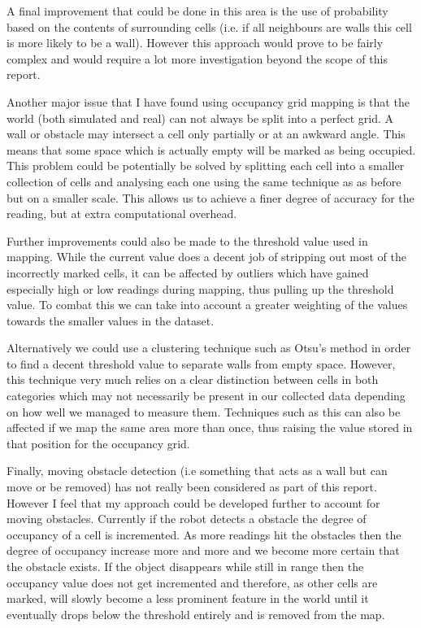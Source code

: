 \documentclass{article}
\begin{document}
A final improvement that could be done in this area is the use of probability based on the contents of surrounding cells (i.e. if all neighbours are walls this cell is more likely to be a wall). However this approach would prove to be fairly complex and would require a lot more investigation beyond the scope of this report.

Another major issue that I have found using occupancy grid mapping is that the world (both simulated and real) can not always be split into a perfect grid. A wall or obstacle may intersect a cell only partially or at an awkward angle. This means that some space which is actually empty will be marked as being occupied. This problem could be potentially be solved by splitting each cell into a smaller collection of cells and analysing each one using the same technique as as before but on a smaller scale. This allows us to achieve a finer degree of accuracy for the reading, but at extra computational overhead.

Further improvements could also be made to the threshold value used in mapping. While the current value does a decent job of stripping out most of the incorrectly marked cells, it can be affected by outliers which have gained especially high or low readings during mapping, thus pulling up the threshold value. To combat this we can take into account a greater weighting of the values towards the smaller values in the dataset.

Alternatively we could use a clustering technique such as Otsu's method in order to find a decent threshold value to separate walls from empty space. However, this technique very much relies on a clear distinction between cells in both categories which may not necessarily be present in our collected data depending on how well we managed to measure them. Techniques such as this can also be affected if we map the same area more than once, thus raising the value stored in that position for the occupancy grid.

Finally, moving obstacle detection (i.e something that acts as a wall but can move or be removed) has not really been considered as part of this report. However I feel that my approach could be developed further to account for moving obstacles. Currently if the robot detects a obstacle the degree of occupancy of a cell is incremented. As more readings hit the obstacles then the degree of occupancy increase more and more and we become more certain that the obstacle exists. If the object disappears while still in range then the occupancy value does not get incremented and therefore, as other cells are marked, will slowly become a less prominent feature in the world until it eventually drops below the threshold entirely and is removed from the map.
\end{document}
